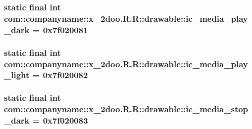 \hypertarget{classcom_1_1companyname_1_1x__2doo_1_1_r_1_1drawable_65f636309714b7a1f8174e3510162e3e}{
\subsubsection[{ic\_\-media\_\-play\_\-dark}]{\setlength{\rightskip}{0pt plus 5cm}static final int com::companyname::x\_\-2doo.R.R::drawable::ic\_\-media\_\-play\_\-dark = 0x7f020081}}
\label{classcom_1_1companyname_1_1x__2doo_1_1_r_1_1drawable_65f636309714b7a1f8174e3510162e3e}


\hypertarget{classcom_1_1companyname_1_1x__2doo_1_1_r_1_1drawable_9f750026843c5d673038618b53f168ff}{
\subsubsection[{ic\_\-media\_\-play\_\-light}]{\setlength{\rightskip}{0pt plus 5cm}static final int com::companyname::x\_\-2doo.R.R::drawable::ic\_\-media\_\-play\_\-light = 0x7f020082}}
\label{classcom_1_1companyname_1_1x__2doo_1_1_r_1_1drawable_9f750026843c5d673038618b53f168ff}


\hypertarget{classcom_1_1companyname_1_1x__2doo_1_1_r_1_1drawable_4510c8ab3c8fe2b3c90283842df689c4}{
\subsubsection[{ic\_\-media\_\-stop\_\-dark}]{\setlength{\rightskip}{0pt plus 5cm}static final int com::companyname::x\_\-2doo.R.R::drawable::ic\_\-media\_\-stop\_\-dark = 0x7f020083}}
\label{classcom_1_1companyname_1_1x__2doo_1_1_r_1_1drawable_4510c8ab3c8fe2b3c90283842df689c4}


